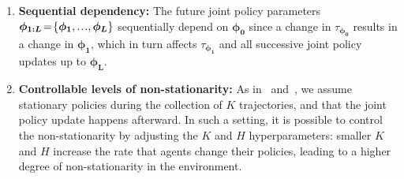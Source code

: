 \begin{enumerate}[leftmargin=*, wide, labelindent=0pt, topsep=0pt, label=\arabic*)]
    \itemsep0em 
    \item \textbf{Sequential dependency:} The future joint policy parameters $\bm{\phi}_{\bm{1:L}}\!=\!\{\bm{\phi}_{\bm{1}}, \sdots,\bm{\phi}_{\bm{L}}\}$ sequentially depend on $\bm{\phi}_{\bm{0}}$ since a change in $\tau_{\bm{\phi}_{\bm{0}}}$ results in a change in $\bm{\phi}_{\bm{1}}$, which in turn affects $\tau_{\bm{\phi}_{\bm{1}}}$ and all successive joint policy updates up to $\bm{\phi}_{\bm{L}}$. 
    \item\textbf{Controllable levels of non-stationarity:} As in~\citet{alshedivat2018continuous} and~\citet{foerster17lola}, we assume stationary policies during the collection of $K$ trajectories, and that the joint policy update happens afterward. In such a setting, it is possible to control the non-stationarity by adjusting the $K$ and $H$ hyperparameters: smaller $K$ and $H$ increase the rate that agents change their policies, leading to a higher degree of non-stationarity in the environment.
\end{enumerate}